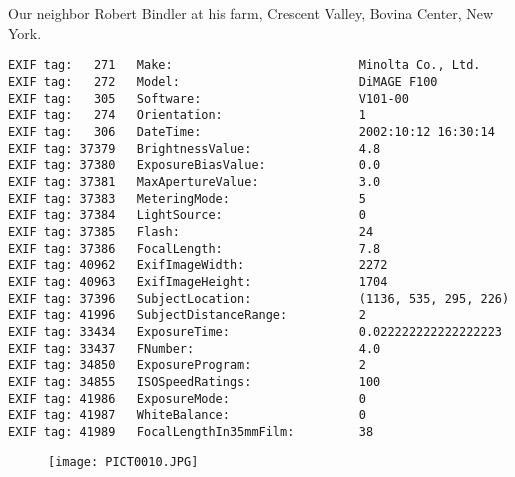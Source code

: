 \section{\protect{}}
\noindent Our neighbor Robert Bindler at his farm, Crescent Valley, Bovina Center, New York.
\noindent
\begin{lstlisting}
EXIF tag:   271   Make:                          Minolta Co., Ltd.
EXIF tag:   272   Model:                         DiMAGE F100
EXIF tag:   305   Software:                      V101-00
EXIF tag:   274   Orientation:                   1
EXIF tag:   306   DateTime:                      2002:10:12 16:30:14
EXIF tag: 37379   BrightnessValue:               4.8
EXIF tag: 37380   ExposureBiasValue:             0.0
EXIF tag: 37381   MaxApertureValue:              3.0
EXIF tag: 37383   MeteringMode:                  5
EXIF tag: 37384   LightSource:                   0
EXIF tag: 37385   Flash:                         24
EXIF tag: 37386   FocalLength:                   7.8
EXIF tag: 40962   ExifImageWidth:                2272
EXIF tag: 40963   ExifImageHeight:               1704
EXIF tag: 37396   SubjectLocation:               (1136, 535, 295, 226)
EXIF tag: 41996   SubjectDistanceRange:          2
EXIF tag: 33434   ExposureTime:                  0.022222222222222223
EXIF tag: 33437   FNumber:                       4.0
EXIF tag: 34850   ExposureProgram:               2
EXIF tag: 34855   ISOSpeedRatings:               100
EXIF tag: 41986   ExposureMode:                  0
EXIF tag: 41987   WhiteBalance:                  0
EXIF tag: 41989   FocalLengthIn35mmFilm:         38

\end{lstlisting}
\clearpage
\begin{figure}
\raggedleft
\texttt{[image: PICT0010.JPG]}
\end{figure}


\clearpage
